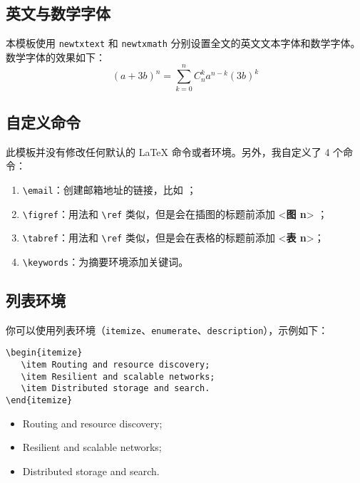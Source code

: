 \documentclass[lang=cn,11pt,numbers, a4paper]{elegantpaper}
\begin{document}
\subsection{英文与数学字体}

本模板使用 \lstinline{newtxtext} 和 \lstinline{newtxmath} 分别设置全文的英文文本字体和数学字体。数学字体的效果如下：
\begin{equation}
(a+3b)^{n} = \sum_{k=0}^{n} C_{n}^{k} a^{n-k} (3b)^k\label{eq:binom}
\end{equation}

\subsection{自定义命令}
此模板并没有修改任何默认的 \LaTeX{} 命令或者环境。另外，我自定义了 4 个命令：
\begin{enumerate}
    \item \lstinline{\email}：创建邮箱地址的链接，比如 ；
    \item \lstinline{\figref}：用法和 \lstinline{\ref} 类似，但是会在插图的标题前添加 <\textbf{图 n}> ；
    \item \lstinline{\tabref}：用法和 \lstinline{\ref} 类似，但是会在表格的标题前添加 <\textbf{表 n}>；
    \item \lstinline{\keywords}：为摘要环境添加关键词。
\end{enumerate}

\subsection{列表环境}
你可以使用列表环境（\lstinline{itemize}、\lstinline{enumerate}、\lstinline{description}），示例如下：\\[2ex]
\begin{minipage}[c]{0.59\linewidth}
\begin{lstlisting}
\begin{itemize}
   \item Routing and resource discovery;
   \item Resilient and scalable networks; 
   \item Distributed storage and search.
\end{itemize}
\end{lstlisting}
\end{minipage}
\begin{minipage}[c]{0.4\linewidth}
\begin{itemize}
   \item Routing and resource discovery;
   \item Resilient and scalable networks;
   \item Distributed storage and search.
\end{itemize}
\end{minipage}
\end{document}
